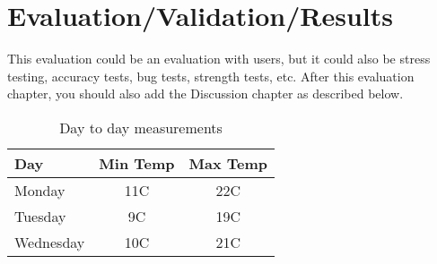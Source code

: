 \chapter{Evaluation/Validation/Results}

This evaluation could be an evaluation with users, but it could also be stress testing, accuracy tests, bug tests, strength tests, etc. After this evaluation chapter, you should also add the Discussion chapter as described below.

\begin{table}[h]\centering
	\begin{tabular}{|l|c|c|}
		\hline
		Day & Min Temp & Max Temp \\ \hline
		Monday & 11C & 22C \\ \hline
		Tuesday & 9C & 19C \\ \hline
		Wednesday & 10C & 21C \\
		\hline
	\end{tabular}
	\caption{Day to day measurements}
	\label{tab:truthTables}  
\end{table}